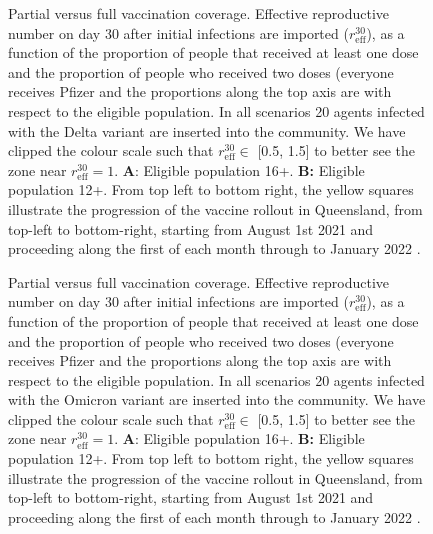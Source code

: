 \documentclass[article, a4, authoryear]{elsarticle}
\begin{document}
\begin{figure}[H]
    \centering
    \hfill
    \hfill
    \caption{Partial versus full vaccination coverage. Effective reproductive number on day 30 after initial infections are imported ($r^{30}_\mathrm{eff}$), as a function of the proportion of people that received at least one dose and the proportion of people who received two doses (everyone receives Pfizer and the proportions along the top axis are with respect to the eligible population. In all scenarios 20 agents infected with the Delta variant are inserted into the community. We have clipped the colour scale such that $r^{30}_\mathrm{eff} \in$ [0.5, 1.5] to better see the zone near $r^{30}_\mathrm{eff}=1$. \textbf{A}: Eligible population 16+. \textbf{B:} Eligible population 12+. From top left to bottom right, the yellow squares illustrate the progression of the vaccine rollout in Queensland, from top-left to bottom-right, starting from August 1st 2021 and proceeding  along the first of each month through to January 2022 \cite{air_vax_data}.}
    \label{fig:heatmap_plot_reff_first_second}
\end{figure}

\begin{figure}[H]
    \centering
    \hfill
    \hfill
    \caption{Partial versus full vaccination coverage. Effective reproductive number on day 30 after initial infections are imported ($r^{30}_\mathrm{eff}$), as a function of the proportion of people that received at least one dose and the proportion of people who received two doses (everyone receives Pfizer and the proportions along the top axis are with respect to the eligible population. In all scenarios 20 agents infected with the Omicron variant are inserted into the community. We have clipped the colour scale such that $r^{30}_\mathrm{eff} \in$ [0.5, 1.5] to better see the zone near $r^{30}_\mathrm{eff}=1$. \textbf{A}: Eligible population 16+. \textbf{B:} Eligible population 12+. From top left to bottom right, the yellow squares illustrate the progression of the vaccine rollout in Queensland, from top-left to bottom-right, starting from August 1st 2021 and proceeding  along the first of each month through to January 2022 \cite{air_vax_data}.}
    \label{fig:heatmap_plot_reff_first_second_omicron}
\end{figure}
\end{document}
